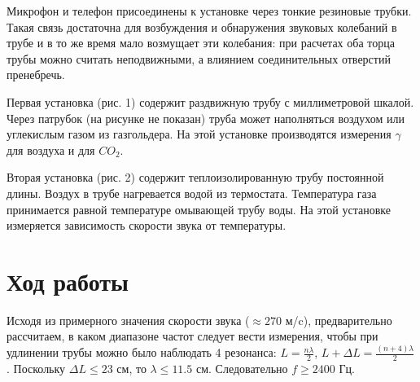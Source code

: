 \documentclass[a4paper, 12pt]{article} %
\begin{document}
    Микрофон и телефон присоединены к установке через тонкие резиновые трубки. Такая связь достаточна для возбуждения и обнаружения звуковых колебаний в трубе и в то же время мало возмущает эти колебания: при расчетах оба торца трубы можно считать неподвижными, а влиянием соединительных отверстий пренебречь.

    Первая установка (рис. 1) содержит раздвижную трубу с миллиметровой шкалой. Через патрубок (на рисунке не показан) труба может наполняться воздухом или углекислым газом из газгольдера. На этой установке производятся измерения $\gamma$ для воздуха и для $CO_2$.
    
    Вторая установка (рис. 2) содержит теплоизолированную трубу постоянной длины. Воздух в трубе нагревается водой из термостата. Температура газа принимается равной температуре омывающей трубу воды. На этой установке измеряется зависимость скорости звука от температуры.
    
\section{Ход работы}

Исходя из примерного значения скорости звука ($ \approx 270$ м/c), предварительно рассчитаем, в каком диапазоне частот следует вести измерения, чтобы при удлинении трубы можно было наблюдать 4 резонанса:
$L = \frac{n\lambda}{2}$, $L + \Delta L = \frac{(n+4)\lambda}{2}$. Поскольку $\Delta L \leq 23$ см, то $\lambda \leq 11.5$ см. Следовательно $f \geq 2400$ Гц. 
        
\end{document}
